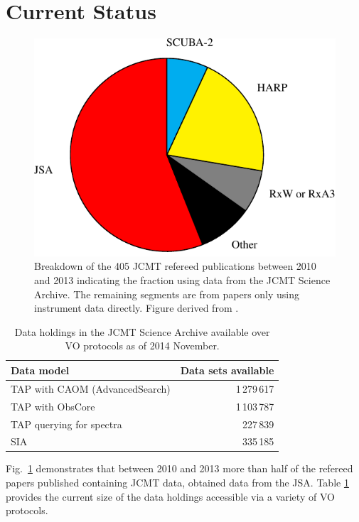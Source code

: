 \documentclass[final,authoryear,5p,times,twocolumn]{elsarticle}
\newcommand*\figref[1]{Fig.~\ref{#1}}
\begin{document}
\section{Current Status}

\begin{figure}[t]
\includegraphics[width=\columnwidth]{jcmt-pubs-crop}
\caption{Breakdown of the 405 JCMT refereed publications between 2010 and
    2013 indicating the fraction using data from the JCMT Science
    Archive. The remaining segments are from papers only using instrument
    data directly. Figure derived from \citet{2014SPIE9152-93}.}
\label{fig:jsapubs}
\end{figure}

\begin{table}
\caption{Data holdings in the JCMT Science Archive available over VO
  protocols as of 2014 November.}
\label{tab:cadcvo}
\begin{center}
\begin{tabular}{|l|r|}
\hline
Data model & Data sets available\\ \hline
TAP with CAOM (AdvancedSearch) & 1\,279\,617 \\
TAP with ObsCore & 1\,103\,787\\
TAP querying for spectra & 227\,839\\
SIA  & 335\,185\\ \hline
\end{tabular}
\end{center}
\end{table}

\figref{fig:jsapubs} demonstrates that between 2010 and 2013 more
than half of the refereed papers published containing JCMT data,
obtained data from the JSA. Table \ref{tab:cadcvo} provides the
current size of the data holdings accessible via a variety of VO protocols.
\end{document}
